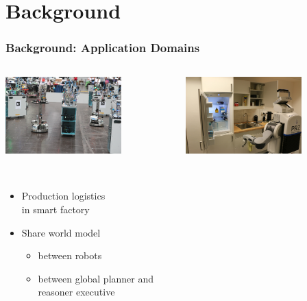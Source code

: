 \section{Background}
\begin{frame}
  \frametitle{Background: Application Domains}
  \begin{columns}
    \begin{column}{0.5\textwidth}
    \begin{flushleft}
    \includegraphics[width=0.7\textwidth]{../thesis/img/rcll-feld}
    \end{flushleft}
  \begin{description}[]
  \item[RoboCup Logistics League] \hfill \\
    \begin{itemize}
    \item Production logistics\\ in smart factory
    \item Share world model
    \begin{itemize}
    \item between robots
    \item between global planner and reasoner executive
    \end{itemize}
    \end{itemize}
  \end{description}
    \end{column}
    \begin{column}{0.5\textwidth}
    \begin{flushright}
    \includegraphics[width=0.7\textwidth]{../thesis/img/pr2-kbsg-kitchen}

\end{flushright}
\end{column}
\end{columns}
\end{frame}
